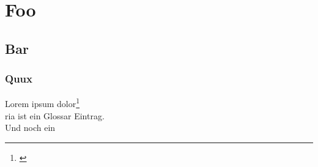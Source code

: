 \chapter{Foo}

\begin{intro}
	\Blindtext[1]
\end{intro}

	\section{Bar}
		\subsection{Quux}
Lorem ipsum dolor\footnote{\cite{Bischoff-2008}}\\
\gls{ria} ist ein Glossar Eintrag.\\
Und noch ein \\
\Blindtext[2][2]